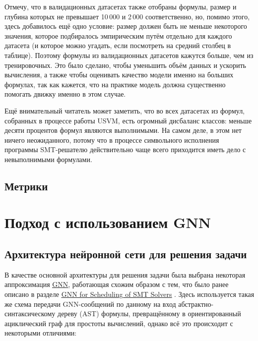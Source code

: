 Отмечу, что в валидационных датасетах также отобраны формулы, размер и глубина которых не превышает 10\,000 и 2\,000 соответственно, но, помимо этого, здесь добавилось ещё одно условие: размер должен быть не меньше некоторого значения, которое подбиралось эмпирическим путём отдельно для каждого датасета (и которое можно угадать, если посмотреть на средний столбец в таблице). Поэтому формулы из валидационных датасетов кажутся больше, чем из тренировочных. Это было сделано, чтобы уменьшить объём данных и ускорить вычисления, а также чтобы оценивать качество модели именно на больших формулах, так как кажется, что на практике модель должна существенно помогать движку именно в этом случае.

Ещё внимательный читатель может заметить, что во всех датасетах из формул, собранных в процессе работы USVM, есть огромный дисбаланс классов: меньше десяти процентов формул являются выполнимыми. На самом деле, в этом нет ничего неожиданного, потому что в процессе символьного исполнения программы SMT-решателю действительно чаще всего приходится иметь дело с невыполнимыми формулами.


\subsection{Метрики}



\newpage

\section{Подход с использованием GNN}

\subsection{Архитектура нейронной сети для решения задачи}

В качестве основной архитектуры для решения задачи была выбрана некоторая аппроксимация \underline{\hyperref[gnn-architecture]{GNN}}, работающая схожим образом с тем, что было ранее описано в разделе \underline{\hyperref[gnn-for-scheduling-of-smt-solvers]{GNN for Scheduling of SMT Solvers}} \cite{gnn-for-scheduling-paper}. Здесь используется такая же схема передачи GNN-сообщений по данному на вход абстрактно-синтаксическому дереву (AST) формулы, превращённому в ориентированный ациклический граф для простоты вычислений, однако всё это происходит с некоторыми отличиями:

